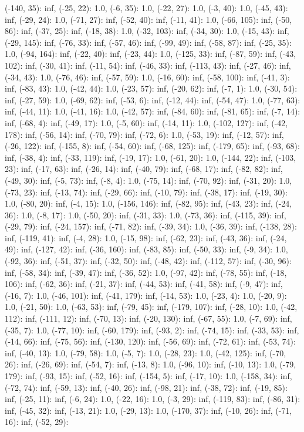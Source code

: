 \documentclass[parskip=half]{scrartcl}
\begin{document}
(-140, 35): inf, (-25, 22): 1.0, (-6, 35): 1.0, (-22, 27): 1.0, (-3, 40): 1.0, (-45, 43): inf, (-29, 24): 1.0, (-71, 27): inf, (-52, 40): inf, (-11, 41): 1.0, (-66, 105): inf, (-50, 86): inf, (-37, 25): inf, (-18, 38): 1.0, (-32, 103): inf, (-34, 30): 1.0, (-15, 43): inf, (-29, 145): inf, (-76, 33): inf, (-57, 46): inf, (-99, 49): inf, (-58, 87): inf, (-25, 35): 1.0, (-94, 164): inf, (-22, 40): inf, (-23, 44): 1.0, (-125, 33): inf, (-87, 59): inf, (-43, 102): inf, (-30, 41): inf, (-11, 54): inf, (-46, 33): inf, (-113, 43): inf, (-27, 46): inf, (-34, 43): 1.0, (-76, 46): inf, (-57, 59): 1.0, (-16, 60): inf, (-58, 100): inf, (-41, 3): inf, (-83, 43): 1.0, (-42, 44): 1.0, (-23, 57): inf, (-20, 62): inf, (-7, 1): 1.0, (-30, 54): inf, (-27, 59): 1.0, (-69, 62): inf, (-53, 6): inf, (-12, 44): inf, (-54, 47): 1.0, (-77, 63): inf, (-44, 11): 1.0, (-41, 16): 1.0, (-42, 57): inf, (-84, 60): inf, (-81, 65): inf, (-7, 14): inf, (-68, 4): inf, (-49, 17): 1.0, (-5, 60): inf, (-14, 11): 1.0, (-102, 127): inf, (-42, 178): inf, (-56, 14): inf, (-70, 79): inf, (-72, 6): 1.0, (-53, 19): inf, (-12, 57): inf, (-26, 122): inf, (-155, 8): inf, (-54, 60): inf, (-68, 125): inf, (-179, 65): inf, (-93, 68): inf, (-38, 4): inf, (-33, 119): inf, (-19, 17): 1.0, (-61, 20): 1.0, (-144, 22): inf, (-103, 23): inf, (-17, 63): inf, (-26, 14): inf, (-40, 79): inf, (-68, 17): inf, (-82, 82): inf, (-49, 30): inf, (-5, 73): inf, (-8, 4): 1.0, (-75, 14): inf, (-70, 92): inf, (-31, 20): 1.0, (-73, 23): inf, (-13, 74): inf, (-29, 66): inf, (-10, 79): inf, (-38, 17): inf, (-19, 30): 1.0, (-80, 20): inf, (-4, 15): 1.0, (-156, 146): inf, (-82, 95): inf, (-43, 23): inf, (-24, 36): 1.0, (-8, 17): 1.0, (-50, 20): inf, (-31, 33): 1.0, (-73, 36): inf, (-115, 39): inf, (-29, 79): inf, (-24, 157): inf, (-71, 82): inf, (-39, 34): 1.0, (-36, 39): inf, (-138, 28): inf, (-119, 41): inf, (-4, 28): 1.0, (-15, 98): inf, (-62, 23): inf, (-43, 36): inf, (-24, 49): inf, (-127, 42): inf, (-36, 160): inf, (-83, 85): inf, (-50, 33): inf, (-9, 34): 1.0, (-92, 36): inf, (-51, 37): inf, (-32, 50): inf, (-48, 42): inf, (-112, 57): inf, (-30, 96): inf, (-58, 34): inf, (-39, 47): inf, (-36, 52): 1.0, (-97, 42): inf, (-78, 55): inf, (-18, 106): inf, (-62, 36): inf, (-21, 37): inf, (-44, 53): inf, (-41, 58): inf, (-9, 47): inf, (-16, 7): 1.0, (-46, 101): inf, (-41, 179): inf, (-14, 53): 1.0, (-23, 4): 1.0, (-20, 9): 1.0, (-21, 50): 1.0, (-63, 53): inf, (-79, 45): inf, (-179, 107): inf, (-28, 10): 1.0, (-42, 112): inf, (-111, 12): inf, (-70, 13): inf, (-20, 130): inf, (-67, 55): 1.0, (-7, 69): inf, (-35, 7): 1.0, (-77, 10): inf, (-60, 179): inf, (-93, 2): inf, (-74, 15): inf, (-33, 53): inf, (-14, 66): inf, (-75, 56): inf, (-130, 120): inf, (-56, 69): inf, (-72, 61): inf, (-53, 74): inf, (-40, 13): 1.0, (-79, 58): 1.0, (-5, 7): 1.0, (-28, 23): 1.0, (-42, 125): inf, (-70, 26): inf, (-26, 69): inf, (-54, 7): inf, (-13, 8): 1.0, (-96, 10): inf, (-10, 13): 1.0, (-79, 179): inf, (-93, 15): inf, (-52, 16): inf, (-154, 5): inf, (-17, 10): 1.0, (-158, 34): inf, (-72, 74): inf, (-59, 13): inf, (-40, 26): inf, (-98, 21): inf, (-38, 72): inf, (-19, 85): inf, (-25, 11): inf, (-6, 24): 1.0, (-22, 16): 1.0, (-3, 29): inf, (-119, 83): inf, (-86, 31): inf, (-45, 32): inf, (-13, 21): 1.0, (-29, 13): 1.0, (-170, 37): inf, (-10, 26): inf, (-71, 16): inf, (-52, 29): 
\end{document}
